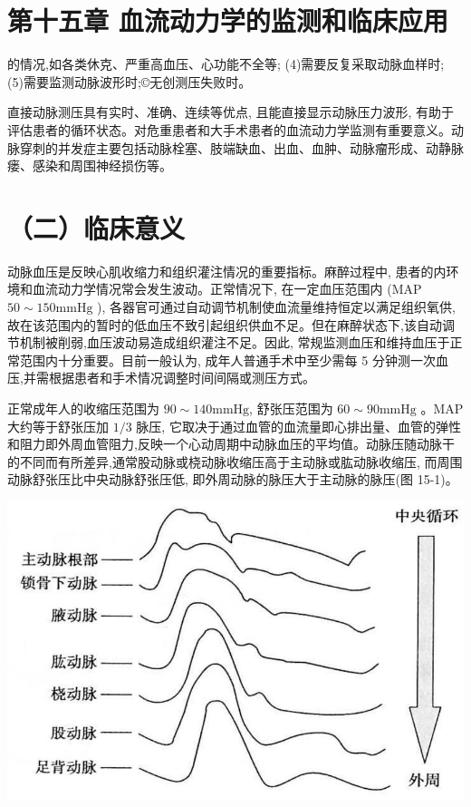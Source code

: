\documentclass[10pt]{article}
\begin{document}
\section*{第十五章 血流动力学的监测和临床应用}
的情况,如各类休克、严重高血压、心功能不全等; (4)需要反复采取动脉血样时; (5)需要监测动脉波形时;©无创测压失败时。

直接动脉测压具有实时、准确、连续等优点, 且能直接显示动脉压力波形, 有助于评估患者的循环状态。对危重患者和大手术患者的血流动力学监测有重要意义。动脉穿刺的并发症主要包括动脉栓塞、肢端缺血、出血、血肿、动脉瘤形成、动静脉瘘、感染和周围神经损伤等。

\section*{（二）临床意义}
动脉血压是反映心肌收缩力和组织灌注情况的重要指标。麻醉过程中, 患者的内环境和血流动力学情况常会发生波动。正常情况下, 在一定血压范围内 (MAP $50 \sim 150 \mathrm{mmHg}$ ), 各器官可通过自动调节机制使血流量维持恒定以满足组织氧供, 故在该范围内的暂时的低血压不致引起组织供血不足。但在麻醉状态下,该自动调节机制被削弱,血压波动易造成组织灌注不足。因此, 常规监测血压和维持血压于正常范围内十分重要。目前一般认为, 成年人普通手术中至少需每 5 分钟测一次血压,并需根据患者和手术情况调整时间间隔或测压方式。

正常成年人的收缩压范围为 $90 \sim 140 \mathrm{mmHg}$, 舒张压范围为 $60 \sim 90 \mathrm{mmHg}$ 。MAP 大约等于舒张压加 $1 / 3$ 脉压, 它取决于通过血管的血流量即心排出量、血管的弹性和阻力即外周血管阻力,反映一个心动周期中动脉血压的平均值。动脉压随动脉干的不同而有所差异,通常股动脉或桡动脉收缩压高于主动脉或肱动脉收缩压, 而周围动脉舒张压比中央动脉舒张压低, 即外周动脉的脉压大于主动脉的脉压(图 15-1)。

\begin{center}
\includegraphics[max width=\textwidth]{2024_07_09_002a177993bd97d1d6d7g-157}
\end{center}
\end{document}
